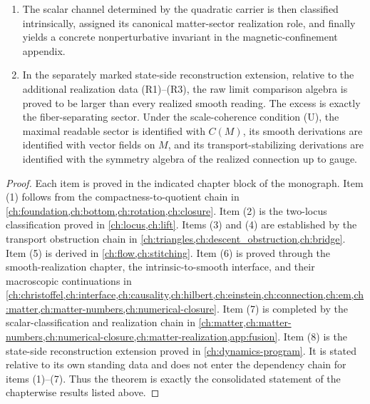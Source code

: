 \begin{theorem}
\begin{enumerate}[label=\textup{(\arabic*)}]
		      numerical-closure consequences.
		\item
		      The scalar channel determined by the quadratic carrier is then
		      classified intrinsically, assigned its canonical matter-sector
		      realization role, and finally yields a concrete nonperturbative
		      invariant in the magnetic-confinement appendix.
		\item
		      In the separately marked state-side reconstruction extension,
		      relative to the additional realization data
		      \textup{(R1)}--\textup{(R3)}, the raw limit comparison
		      algebra is proved to be larger than every realized smooth
		      reading. The excess is exactly the fiber-separating sector.
		      Under the scale-coherence condition \textup{(U)}, the maximal
		      readable sector is identified with \(C(M)\), its smooth
		      derivations are identified with vector fields on \(M\), and
		      its transport-stabilizing derivations are identified with the
		      symmetry algebra of the realized connection up to gauge.
	\end{enumerate}
\end{theorem}
\begin{proof}
	Each item is proved in the indicated chapter block of the monograph.
	Item \textup{(1)} follows from the compactness-to-quotient chain in
	\cref{ch:foundation,ch:bottom,ch:rotation,ch:closure}.
	Item \textup{(2)} is the two-locus classification proved in
	\cref{ch:locus,ch:lift}.
	Items \textup{(3)} and \textup{(4)} are established by the transport
	obstruction chain in
	\cref{ch:triangles,ch:descent_obstruction,ch:bridge}.
		Item \textup{(5)} is derived in
		\cref{ch:flow,ch:stitching}.
		Item \textup{(6)} is proved through the smooth-realization chapter, the
		intrinsic-to-smooth interface, and their macroscopic
		continuations in
		\cref{ch:christoffel,ch:interface,ch:causality,ch:hilbert,ch:einstein,ch:connection,ch:em,ch:matter,ch:matter-numbers,ch:numerical-closure}.
		Item \textup{(7)} is completed by the scalar-classification and
		realization chain in
		\cref{ch:matter,ch:matter-numbers,ch:numerical-closure,ch:matter-realization,app:fusion}.
		Item \textup{(8)} is the state-side reconstruction extension proved in
		\cref{ch:dynamics-program}. It is stated relative to its own standing
		data and does not enter the dependency chain for items
		\textup{(1)}--\textup{(7)}.
		Thus the theorem is exactly the consolidated statement of the chapterwise
		results listed above.
\end{proof}

